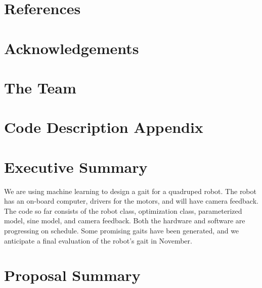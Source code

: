 \section{References}




\section{Acknowledgements}




\section{The Team}




\section{Code Description Appendix}











\section{Executive Summary}
We are using machine learning to design a gait for a quadruped
robot. The robot has an on-board computer, drivers for the motors, and
will have camera feedback. The code so far consists of the robot
class, optimization class, parameterized model, sine model, and camera
feedback.  Both the hardware and software are progressing on schedule.
Some promising gaits have been generated, and we anticipate a final
evaluation of the robot’s gait in November.



\section{Proposal Summary}


